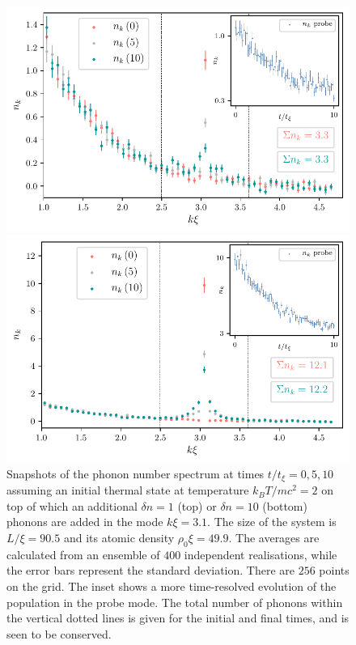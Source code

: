 \documentclass[aps,prd,notitlepage,amsfonts,amssymb,amsmath,nofootinbib,superscriptaddress,longbibliography]{revtex4-2}
\begin{document}
\begin{figure}
    \centering
         \begin{minipage}{0.49\textwidth}
        \centering
        \includegraphics[width=\textwidth]{fig1a.pdf}
    \end{minipage} \hfill
          \begin{minipage}{0.49\textwidth}
        \centering
         \includegraphics[width=\textwidth]{fig1b.pdf}
  
    \end{minipage}
    
    \caption{Snapshots of the phonon number spectrum at  times $t/t_{\xi}=0,5,10$ assuming an initial
    thermal state at temperature $k_{B} T/m c^2 = 2$ on top of which an additional $\delta n = 1$ (top) or $\delta n = 10$ (bottom) phonons are added in the mode $k \xi = 3.1$. The size of the system is $L/\xi = 90.5$ and its atomic density $\rho_0 \xi =49.9$. The averages are calculated from an ensemble of $400$ independent realisations, while the error bars represent the standard deviation. There are $256$ points on the grid. The inset shows a more time-resolved evolution of the population in the probe mode. The total number of phonons within the vertical dotted lines is given for the initial and final times, and is seen to be conserved.
    \label{fig:phonon_spectrum_different_probes}}

\end{figure}
\end{document}
